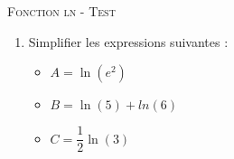 \documentclass[a4paper]{article}
\begin{document}
\begin{center}
  {\scshape\LARGE Fonction ln - Test\par}
  \vspace{0.5cm}
\end{center}

\NomPrenom{}

\vspace{1cm}

\begin{enumerate}
    \item Simplifier les expressions suivantes :
    \begin{itemize}
        \item $A = \ln(e^2)$
        \zonereponse{1cm}
        \item $B = \ln(5)+ln(6)$
        \zonereponse{1cm}
        \item $C = \dfrac{1}{2} \ln(3)$
        \zonereponse{1cm}
    \end{itemize}
\end{enumerate}
\zonereponse{2cm}
\end{document}
